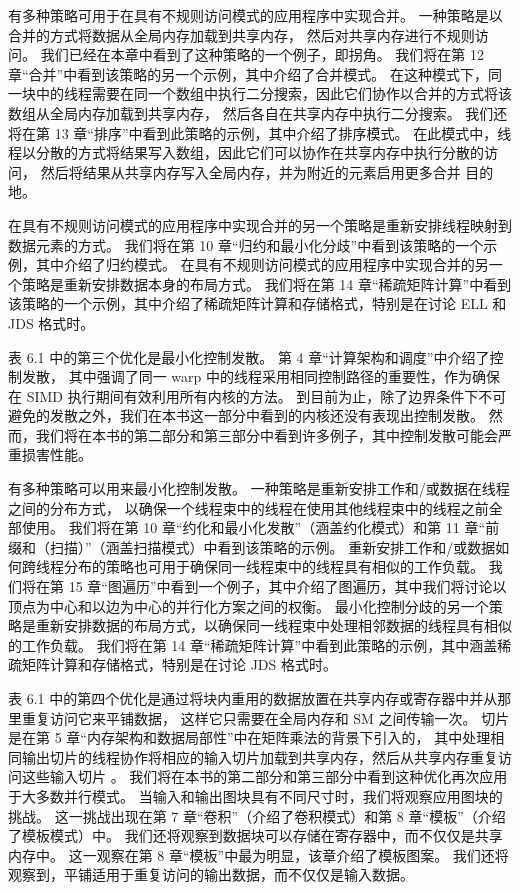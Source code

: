 有多种策略可用于在具有不规则访问模式的应用程序中实现合并。 一种策略是以合并的方式将数据从全局内存加载到共享内存，
然后对共享内存进行不规则访问。 我们已经在本章中看到了这种策略的一个例子，即拐角。 
我们将在第 12 章“合并”中看到该策略的另一个示例，其中介绍了合并模式。 
在这种模式下，同一块中的线程需要在同一个数组中执行二分搜索，因此它们协作以合并的方式将该数组从全局内存加载到共享内存，
然后各自在共享内存中执行二分搜索。 我们还将在第 13 章“排序”中看到此策略的示例，其中介绍了排序模式。 
在此模式中，线程以分散的方式将结果写入数组，因此它们可以协作在共享内存中执行分散的访问，
然后将结果从共享内存写入全局内存，并为附近的元素启用更多合并 目的地。

在具有不规则访问模式的应用程序中实现合并的另一个策略是重新安排线程映射到数据元素的方式。 
我们将在第 10 章“归约和最小化分歧”中看到该策略的一个示例，其中介绍了归约模式。 
在具有不规则访问模式的应用程序中实现合并的另一个策略是重新安排数据本身的布局方式。 
我们将在第 14 章“稀疏矩阵计算”中看到该策略的一个示例，其中介绍了稀疏矩阵计算和存储格式，特别是在讨论 ELL 和 JDS 格式时。

表 6.1 中的第三个优化是最小化控制发散。 第 4 章“计算架构和调度”中介绍了控制发散，
其中强调了同一 warp 中的线程采用相同控制路径的重要性，作为确保在 SIMD 执行期间有效利用所有内核的方法。 
到目前为止，除了边界条件下不可避免的发散之外，我们在本书这一部分中看到的内核还没有表现出控制发散。 
然而，我们将在本书的第二部分和第三部分中看到许多例子，其中控制发散可能会严重损害性能。

有多种策略可以用来最小化控制发散。 一种策略是重新安排工作和/或数据在线程之间的分布方式，
以确保一个线程束中的线程在使用其他线程束中的线程之前全部使用。 
我们将在第 10 章“约化和最小化发散”（涵盖约化模式）和第 11 章“前缀和（扫描）”（涵盖扫描模式）中看到该策略的示例。 
重新安排工作和/或数据如何跨线程分布的策略也可用于确保同一线程束中的线程具有相似的工作负载。 
我们将在第 15 章“图遍历”中看到一个例子，其中介绍了图遍历，其中我们将讨论以顶点为中心和以边为中心的并行化方案之间的权衡。 
最小化控制分歧的另一个策略是重新安排数据的布局方式，以确保同一线程束中处理相邻数据的线程具有相似的工作负载。 
我们将在第 14 章“稀疏矩阵计算”中看到此策略的示例，其中涵盖稀疏矩阵计算和存储格式，特别是在讨论 JDS 格式时。

表 6.1 中的第四个优化是通过将块内重用的数据放置在共享内存或寄存器中并从那里重复访问它来平铺数据，
这样它只需要在全局内存和 SM 之间传输一次。 切片是在第 5 章“内存架构和数据局部性”中在矩阵乘法的背景下引入的，
其中处理相同输出切片的线程协作将相应的输入切片加载到共享内存，然后从共享内存重复访问这些输入切片 。 
我们将在本书的第二部分和第三部分中看到这种优化再次应用于大多数并行模式。 
当输入和输出图块具有不同尺寸时，我们将观察应用图块的挑战。 
这一挑战出现在第 7 章“卷积”（介绍了卷积模式）和第 8 章“模板”（介绍了模板模式）中。 
我们还将观察到数据块可以存储在寄存器中，而不仅仅是共享内存中。 
这一观察在第 8 章“模板”中最为明显，该章介绍了模板图案。 
我们还将观察到，平铺适用于重复访问的输出数据，而不仅仅是输入数据。

